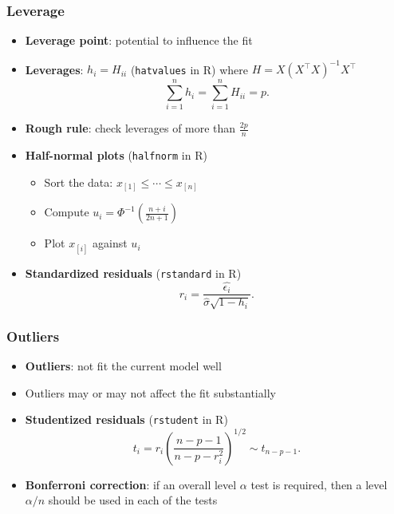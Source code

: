 \documentclass[serif,mathserif,professionalfont]{beamer}
\begin{document}
\begin{frame}
	
	\frametitle{Leverage}
	
	\begin{itemize}
		\item \textbf{Leverage point}: potential to influence the fit
		\item \textbf{Leverages}: $ h_i = H_{ii} $ (\texttt{hatvalues} in R) where $ H = X (X^\top X)^{-1} X^\top $
		$$ \sum_{i=1}^{n} h_i = \sum_{i=1}^{n} H_{ii} = p. $$
		\item \textbf{Rough rule}: check leverages of more than $ \frac{2p}{n} $
		\item \textbf{Half-normal plots} (\texttt{halfnorm} in R)
		\begin{itemize}
			\item Sort the data: $ x_{[1]} \leq \cdots \leq x_{[n]} $
			\item Compute $ u_i = \Phi^{-1}\left(\frac{n+i}{2n+1} \right) $
			\item Plot $ x_{[i]} $ against $ u_i $
		\end{itemize}
		\item \textbf{Standardized residuals} (\texttt{rstandard} in R)
		$$ r_i = \frac{\widehat{\epsilon_i}}{\widehat{\sigma} \sqrt{1-h_i}}. $$
	\end{itemize}
	
	
	
\end{frame}





\begin{frame}
	
	\frametitle{Outliers}
	
	\begin{itemize}
		\item \textbf{Outliers}: not fit the current model well
		\item Outliers may or may not affect the fit substantially
		\item \textbf{Studentized residuals} (\texttt{rstudent} in R)
		$$ t_i = r_i \left(\frac{n - p - 1}{n - p - r_i^2} \right)^{1/2} \sim t_{n-p-1}. $$
		\item \textbf{Bonferroni correction}: if an overall level $ \alpha $ test is required, then a level $ \alpha/n $ should be used in each of the tests
	\end{itemize}
	
	
	
\end{frame}
\end{document}
